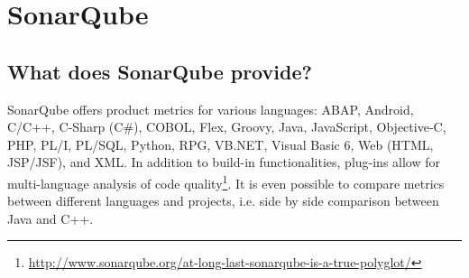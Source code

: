 
\section{SonarQube}
\subsection{What does SonarQube provide?}
SonarQube offers product metrics for various languages: ABAP, Android, C/C++,
C-Sharp (C\#), COBOL, Flex, Groovy, Java, JavaScript, Objective-C, PHP, PL/I,
PL/SQL, Python, RPG, VB.NET, Visual Basic 6, Web (HTML, JSP/JSF), and XML. In
addition to build-in functionalities, plug-ins allow for multi-language analysis
of code
quality\footnote{\url{http://www.sonarqube.org/at-long-last-sonarqube-is-a-true-polyglot/}}.
It is even possible to compare metrics between different languages and projects,
i.e. side by side comparison between Java and C++.


